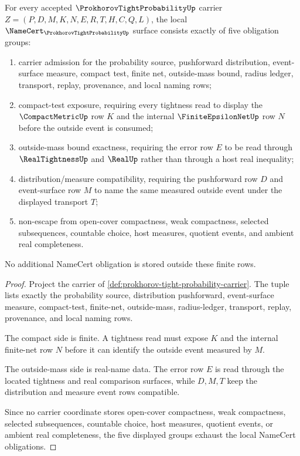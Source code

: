 \begin{theorem}
\label{thm:prokhorov-tight-probability-namecert-obligations}
For every accepted $\ProkhorovTightProbabilityUp$ carrier $Z=(P,D,M,K,N,E,R,T,H,C,Q,L)$, the local $\NameCert_{\ProkhorovTightProbabilityUp}$ surface consists exactly of five obligation groups:
\begin{enumerate}
\item carrier admission for the probability source, pushforward distribution, event-surface measure, compact test, finite net, outside-mass bound, radius ledger, transport, replay, provenance, and local naming rows;
\item compact-test exposure, requiring every tightness read to display the $\CompactMetricUp$ row $K$ and the internal $\FiniteEpsilonNetUp$ row $N$ before the outside event is consumed;
\item outside-mass bound exactness, requiring the error row $E$ to be read through $\RealTightnessUp$ and $\RealUp$ rather than through a host real inequality;
\item distribution/measure compatibility, requiring the pushforward row $D$ and event-surface row $M$ to name the same measured outside event under the displayed transport $T$;
\item non-escape from open-cover compactness, weak compactness, selected subsequences, countable choice, host measures, quotient events, and ambient real completeness.
\end{enumerate}
No additional NameCert obligation is stored outside these finite rows.
\end{theorem}
\begin{proof}
Project the carrier of \autoref{def:prokhorov-tight-probability-carrier}. The tuple lists exactly the probability source, distribution pushforward, event-surface measure, compact-test, finite-net, outside-mass, radius-ledger, transport, replay, provenance, and local naming rows.

The compact side is finite. A tightness read must expose $K$ and the internal finite-net row $N$ before it can identify the outside event measured by $M$.

The outside-mass side is real-name data. The error row $E$ is read through the located tightness and real comparison surfaces, while $D,M,T$ keep the distribution and measure event rows compatible.

Since no carrier coordinate stores open-cover compactness, weak compactness, selected subsequences, countable choice, host measures, quotient events, or ambient real completeness, the five displayed groups exhaust the local NameCert obligations.
\end{proof}

